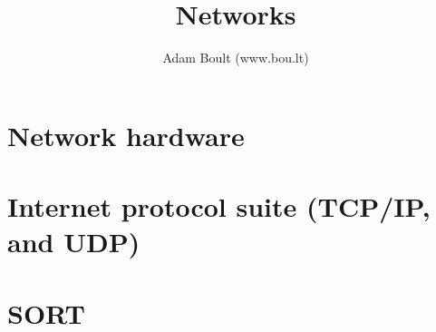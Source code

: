 \documentclass[oneside]{book}
\begin{document}
\author{Adam Boult (www.bou.lt)}
\title{Networks}
\maketitle

\setcounter{tocdepth}{0}
\tableofcontents



\part{Network hardware}

\part{Internet protocol suite (TCP/IP, and UDP)}


\part{SORT}

\end{document}
